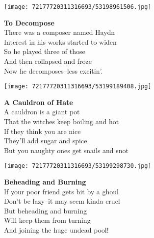 \documentclass[10pt,letterpaper]{article}
\begin{document}
\begin{center}
\texttt{[image: 72177720311316693/53198961506.jpg]}
\end{center}

\begin{center}
\textbf{To Decompose}\\
\vskip 0.2in
There was a composer named Haydn\\
Interest in his works started to widen\\
So he played three of those\\
And then collapsed and froze\\
Now he decomposes--less excitin'.\\
\end{center}
\pagebreak

\begin{center}\texttt{[image: 72177720311316693/53199189408.jpg]}
\end{center}
\begin{center}
\textbf{A Cauldron of Hate}\\
\vskip 0.2in
A cauldron is a giant pot\\
That the witches keep boiling and hot\\
If they think you are nice\\
They'll add sugar and spice\\
But you naughty ones get snails and snot\\
\end{center}
\pagebreak

\begin{center}
\texttt{[image: 72177720311316693/53199298730.jpg]}
\end{center}

\begin{center}
\textbf{Beheading and Burning}\\
\vskip 0.2in
If your poor friend gets bit by a ghoul\\
Don't be lazy--it may seem kinda cruel\\
But beheading and burning\\
Will keep them from turning\\
And joining the huge undead pool!\\
\end{center}
\pagebreak
\end{document}
